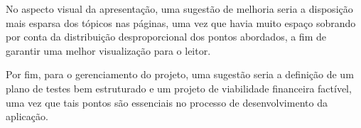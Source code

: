 No aspecto visual da apresentação, uma sugestão de melhoria seria a disposição mais esparsa dos tópicos nas páginas, uma vez que havia muito espaço sobrando por conta da distribuição desproporcional dos pontos abordados, a fim de garantir uma melhor visualização para o leitor.


Por fim, para o gerenciamento do projeto, uma sugestão seria a definição de um plano de testes bem estruturado e um projeto de viabilidade financeira factível, uma vez que tais pontos são essenciais no processo de desenvolvimento da aplicação.